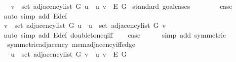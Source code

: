 \begin{isabellebody}
\ \ \ {\isachardoublequoteopen}v\ {\isasymin}\ set\ {\isacharparenleft}{\kern0pt}adjacency{\isacharunderscore}{\kern0pt}list\ G\ u{\isacharparenright}{\kern0pt}\ {\isasymlongleftrightarrow}\ {\isacharbraceleft}{\kern0pt}u{\isacharcomma}{\kern0pt}\ v{\isacharbraceright}{\kern0pt}\ {\isasymin}\ E\ G{\isachardoublequoteclose}\isanewline
%
\isadelimproof
%
\endisadelimproof
%
\isatagproof
{}\isamarkupfalse%
\ {\isacharparenleft}{\kern0pt}standard{\isacharcomma}{\kern0pt}\ goal{\isacharunderscore}{\kern0pt}cases{\isacharparenright}{\kern0pt}\isanewline
\ \ \isamarkupfalse%
\ {}\isanewline
\ \ \isamarkupfalse%
\ {\isacharquery}{\kern0pt}case\isanewline
\ \ \ \ \isamarkupfalse%
\ {\isacharparenleft}{\kern0pt}auto\ simp\ add{\isacharcolon}{\kern0pt}\ E{\isacharunderscore}{\kern0pt}def{\isacharparenright}{\kern0pt}\isanewline
{}\isamarkupfalse%
\isanewline
\ \ \isamarkupfalse%
\ {}\isanewline
\ \ \isamarkupfalse%
\ {\isachardoublequoteopen}v\ {\isasymin}\ set\ {\isacharparenleft}{\kern0pt}adjacency{\isacharunderscore}{\kern0pt}list\ G\ u{\isacharparenright}{\kern0pt}\ {\isasymor}\ u\ {\isasymin}\ set\ {\isacharparenleft}{\kern0pt}adjacency{\isacharunderscore}{\kern0pt}list\ G\ v{\isacharparenright}{\kern0pt}{\isachardoublequoteclose}\isanewline
\ \ \ \ \isamarkupfalse%
\ {\isacharparenleft}{\kern0pt}auto\ simp\ add{\isacharcolon}{\kern0pt}\ E{\isacharunderscore}{\kern0pt}def\ doubleton{\isacharunderscore}{\kern0pt}eq{\isacharunderscore}{\kern0pt}iff{\isacharparenright}{\kern0pt}\isanewline
\ \ \isamarkupfalse%
\ {\isacharquery}{\kern0pt}case\isanewline
\ \ \ \ \isamarkupfalse%
\ {\isacharparenleft}{\kern0pt}simp\ add{\isacharcolon}{\kern0pt}\ symmetric{\isacharparenright}{\kern0pt}\isanewline
{}\isamarkupfalse%
%
\endisatagproof
{\isafoldproof}%
%
\isadelimproof
\isanewline
%
\endisadelimproof
\isanewline
{}\isamarkupfalse%
\ {\isacharparenleft}{\kern0pt}\ symmetric{\isacharunderscore}{\kern0pt}adjacency{\isacharparenright}{\kern0pt}\ mem{\isacharunderscore}{\kern0pt}adjacency{\isacharunderscore}{\kern0pt}iff{\isacharunderscore}{\kern0pt}edge{\isacharunderscore}{\kern0pt}{}{\isacharcolon}{\kern0pt}\isanewline
\ \ \ {\isachardoublequoteopen}u\ {\isasymin}\ set\ {\isacharparenleft}{\kern0pt}adjacency{\isacharunderscore}{\kern0pt}list\ G\ v{\isacharparenright}{\kern0pt}\ {\isasymlongleftrightarrow}\ {\isacharbraceleft}{\kern0pt}u{\isacharcomma}{\kern0pt}\ v{\isacharbraceright}{\kern0pt}\ {\isasymin}\ E\ G{\isachardoublequoteclose}\isanewline

\end{isabellebody}
